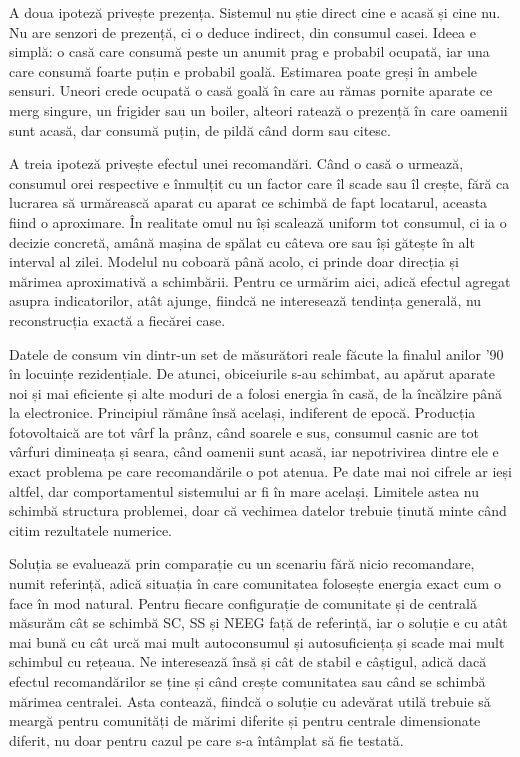 \documentclass[12pt,a4paper]{report}
\begin{document}
A doua ipoteză privește prezența. Sistemul nu știe direct cine e acasă și cine nu. Nu are senzori de prezență, ci o deduce indirect, din consumul casei. Ideea e simplă: o casă care consumă peste un anumit prag e probabil ocupată, iar una care consumă foarte puțin e probabil goală. Estimarea poate greși în ambele sensuri. Uneori crede ocupată o casă goală în care au rămas pornite aparate ce merg singure, un frigider sau un boiler, alteori ratează o prezență în care oamenii sunt acasă, dar consumă puțin, de pildă când dorm sau citesc.

A treia ipoteză privește efectul unei recomandări. Când o casă o urmează, consumul orei respective e înmulțit cu un factor care îl scade sau îl crește, fără ca lucrarea să urmărească aparat cu aparat ce schimbă de fapt locatarul, aceasta fiind o aproximare. În realitate omul nu își scalează uniform tot consumul, ci ia o decizie concretă, amână mașina de spălat cu câteva ore sau își gătește în alt interval al zilei. Modelul nu coboară până acolo, ci prinde doar direcția și mărimea aproximativă a schimbării. Pentru ce urmărim aici, adică efectul agregat asupra indicatorilor, atât ajunge, fiindcă ne interesează tendința generală, nu reconstrucția exactă a fiecărei case.

Datele de consum vin dintr-un set de măsurători reale făcute la finalul anilor '90 în locuințe rezidențiale. De atunci, obiceiurile s-au schimbat, au apărut aparate noi și mai eficiente și alte moduri de a folosi energia în casă, de la încălzire până la electronice. Principiul rămâne însă același, indiferent de epocă. Producția fotovoltaică are tot vârf la prânz, când soarele e sus, consumul casnic are tot vârfuri dimineața și seara, când oamenii sunt acasă, iar nepotrivirea dintre ele e exact problema pe care recomandările o pot atenua. Pe date mai noi cifrele ar ieși altfel, dar comportamentul sistemului ar fi în mare același. Limitele astea nu schimbă structura problemei, doar că vechimea datelor trebuie ținută minte când citim rezultatele numerice.

Soluția se evaluează prin comparație cu un scenariu fără nicio recomandare, numit referință, adică situația în care comunitatea folosește energia exact cum o face în mod natural. Pentru fiecare configurație de comunitate și de centrală măsurăm cât se schimbă SC, SS și NEEG față de referință, iar o soluție e cu atât mai bună cu cât urcă mai mult autoconsumul și autosuficiența și scade mai mult schimbul cu rețeaua. Ne interesează însă și cât de stabil e câștigul, adică dacă efectul recomandărilor se ține și când crește comunitatea sau când se schimbă mărimea centralei. Asta contează, fiindcă o soluție cu adevărat utilă trebuie să meargă pentru comunități de mărimi diferite și pentru centrale dimensionate diferit, nu doar pentru cazul pe care s-a întâmplat să fie testată.
\end{document}
